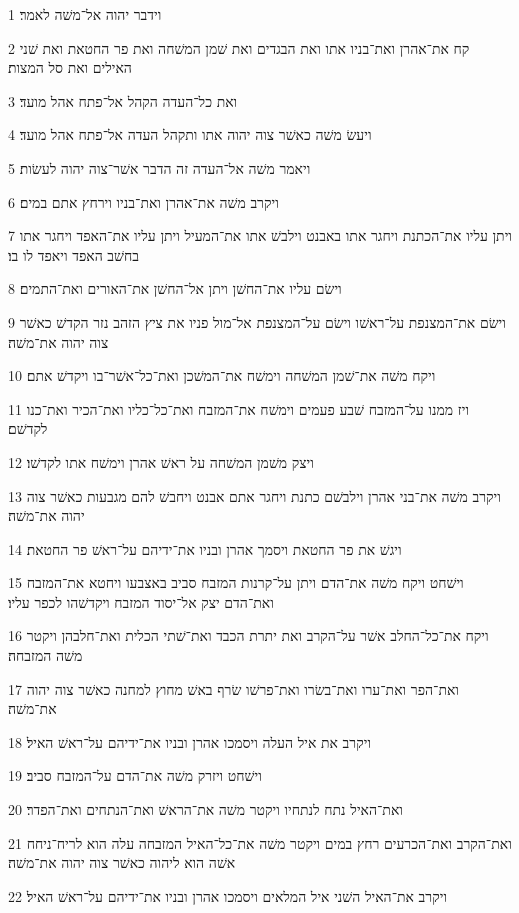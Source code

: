 \par 1 וידבר יהוה אל־משׁה לאמר׃
\par 2 קח את־אהרן ואת־בניו אתו ואת הבגדים ואת שׁמן המשׁחה ואת פר החטאת ואת שׁני האילים ואת סל המצות׃
\par 3 ואת כל־העדה הקהל אל־פתח אהל מועד׃
\par 4 ויעשׂ משׁה כאשׁר צוה יהוה אתו ותקהל העדה אל־פתח אהל מועד׃
\par 5 ויאמר משׁה אל־העדה זה הדבר אשׁר־צוה יהוה לעשׂות׃
\par 6 ויקרב משׁה את־אהרן ואת־בניו וירחץ אתם במים׃
\par 7 ויתן עליו את־הכתנת ויחגר אתו באבנט וילבשׁ אתו את־המעיל ויתן עליו את־האפד ויחגר אתו בחשׁב האפד ויאפד לו בו׃
\par 8 וישׂם עליו את־החשׁן ויתן אל־החשׁן את־האורים ואת־התמים׃
\par 9 וישׂם את־המצנפת על־ראשׁו וישׂם על־המצנפת אל־מול פניו את ציץ הזהב נזר הקדשׁ כאשׁר צוה יהוה את־משׁה׃
\par 10 ויקח משׁה את־שׁמן המשׁחה וימשׁח את־המשׁכן ואת־כל־אשׁר־בו ויקדשׁ אתם׃
\par 11 ויז ממנו על־המזבח שׁבע פעמים וימשׁח את־המזבח ואת־כל־כליו ואת־הכיר ואת־כנו לקדשׁם׃
\par 12 ויצק משׁמן המשׁחה על ראשׁ אהרן וימשׁח אתו לקדשׁו׃
\par 13 ויקרב משׁה את־בני אהרן וילבשׁם כתנת ויחגר אתם אבנט ויחבשׁ להם מגבעות כאשׁר צוה יהוה את־משׁה׃
\par 14 ויגשׁ את פר החטאת ויסמך אהרן ובניו את־ידיהם על־ראשׁ פר החטאת׃
\par 15 וישׁחט ויקח משׁה את־הדם ויתן על־קרנות המזבח סביב באצבעו ויחטא את־המזבח ואת־הדם יצק אל־יסוד המזבח ויקדשׁהו לכפר עליו׃
\par 16 ויקח את־כל־החלב אשׁר על־הקרב ואת יתרת הכבד ואת־שׁתי הכלית ואת־חלבהן ויקטר משׁה המזבחה׃
\par 17 ואת־הפר ואת־ערו ואת־בשׂרו ואת־פרשׁו שׂרף באשׁ מחוץ למחנה כאשׁר צוה יהוה את־משׁה׃
\par 18 ויקרב את איל העלה ויסמכו אהרן ובניו את־ידיהם על־ראשׁ האיל׃
\par 19 וישׁחט ויזרק משׁה את־הדם על־המזבח סביב׃
\par 20 ואת־האיל נתח לנתחיו ויקטר משׁה את־הראשׁ ואת־הנתחים ואת־הפדר׃
\par 21 ואת־הקרב ואת־הכרעים רחץ במים ויקטר משׁה את־כל־האיל המזבחה עלה הוא לריח־ניחח אשׁה הוא ליהוה כאשׁר צוה יהוה את־משׁה׃
\par 22 ויקרב את־האיל השׁני איל המלאים ויסמכו אהרן ובניו את־ידיהם על־ראשׁ האיל׃
